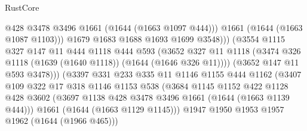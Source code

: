 \begin{lexlean}{RustCore}
\begin{coremodule}
                                        @428
                                        @3478
                                        @3496
                                        @1661
                                        (@1644 (@1663 @1097 @444)))
                                      @1661
                                      (@1644 (@1663 @1087 @1103)))
                                    @1679
                                    @1683
                                    @1688
                                    @1693
                                    @1699
                                    @3548)))
                              (@3554
                                @1115
                                @327
                                @147
                                @11
                                @444
                                @1118
                                @444
                                @593
                                (@3652
                                  @327
                                  @11
                                  @1118
                                  (@3474 @326 @1118 (@1639 (@1640 @1118)) (@1644 (@1646 @326 @11))))
                                (@3652 @147 @11 @593 @3478)))
                            (@3397
                              @331
                              @233
                              @335
                              @11
                              @1146
                              @1155
                              @444
                              @1162
                              (@3407
                                @109
                                @322
                                @17
                                @318
                                @1146
                                @1153
                                @538
                                (@3684
                                  @1145
                                  @1152
                                  @422
                                  @1128
                                  @428
                                  @3602
                                  (@3697 @1138 @428 @3478 @3496 @1661 (@1644 (@1663 @1139 @444)))
                                  @1661
                                  (@1644 (@1663 @1129 @1145)))
                                @1947
                                @1950
                                @1953
                                @1957
                                @1962
                                (@1644 (@1966 @465)))

\end{coremodule}
\end{lexlean}
